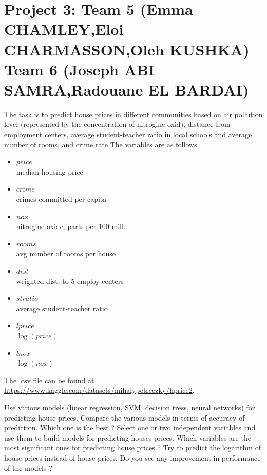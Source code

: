 \documentclass{article}
\begin{document}
 




\section*{Project 3:  Team 5 (Emma CHAMLEY,Eloi CHARMASSON,Oleh KUSHKA) Team 6 (Joseph ABI SAMRA,Radouane EL BARDAI) }
    The task is to predict house prices in different communities based on air pollution level (represented by the concentration of nitrogine oxid), 
distance from employment centers, average student-teacher ratio 
 in local schools and average number of rooms, and crime rate The variables are as follows:
    \begin{itemize}
    \item{$price$ \\}       
	median housing price
    \item{$crime$ \\}                    
		crimes committed per capita
    \item{$nox$ \\}                      
	nitrogine oxide, parts per 100 mill.
    \item{$rooms$ \\}                    
    avg number of rooms per house
    \item{$dist$ \\}                     
      weighted dist. to 5 employ centers
    \item{$stratio$ \\}                  average student-teacher ratio
    \item{$lprice$ \\}                   $\log(price)$
    \item{$lnox$ \\}                     $\log(nox)$
   \end{itemize}

   The .csv file can be found at \url{https://www.kaggle.com/datasets/mihalypetreczky/hprice2}. 
    
     Use various models (linear regression, SVM, decision tress, neural networks) for predicting house prices. Compare the various models in terms of accuracy of prediction. Which one is the best ? 
 Select one or two independent variables  and use them to build models for predicting houses prices. Which variables are the most
 significant ones for predicting  house prices  ?  Try to predict the logarithm of house prices instead of house prices. Do you see any improvement in performance of the models ?
\end{document}
